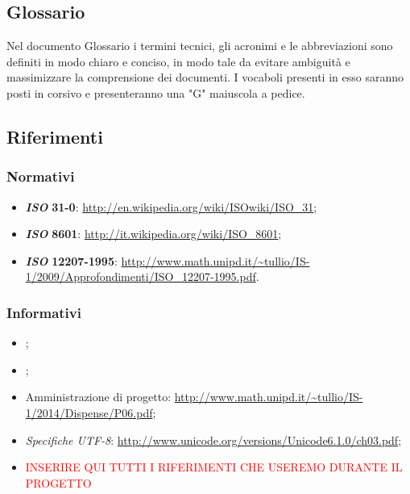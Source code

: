\subsection{Glossario}
Nel documento Glossario i termini tecnici, gli acronimi e le abbreviazioni sono definiti in modo chiaro e conciso, in modo tale da evitare ambiguità e massimizzare la comprensione dei documenti.
\newline I vocaboli presenti in esso saranno posti in corsivo e presenteranno una "G" maiuscola a pedice.
\subsection{Riferimenti}
\subsubsection{Normativi}
\begin{itemize}
	\item
	\textbf{\textit{ISO}} \textbf{31-0}: \url{http://en.wikipedia.org/wiki/ISOwiki/ISO\_31};
	\item
	\textbf{\textit{ISO}} \textbf{8601}: \url{http://it.wikipedia.org/wiki/ISO\_8601};
	\item
	\textbf{\textit{ISO}} \textbf{12207-1995}: \url{http://www.math.unipd.it/~tullio/IS-1/2009/Approfondimenti/ISO\_12207-1995.pdf}.
\end{itemize}
\subsubsection{Informativi}
\begin{itemize}
	\item \PdPv;
	\item \PdQv;
	\item Amministrazione di progetto: \url{http://www.math.unipd.it/~tullio/IS-1/2014/Dispense/P06.pdf};
	\item \textit{Specifiche \textit{UTF-8}}: \url{http://www.unicode.org/versions/Unicode6.1.0/ch03.pdf};
	\item \textcolor{red}{INSERIRE QUI TUTTI I RIFERIMENTI CHE USEREMO DURANTE IL PROGETTO}
\end{itemize}
